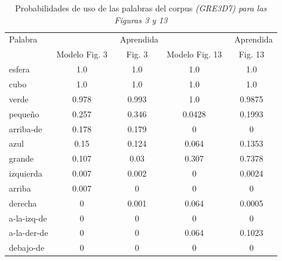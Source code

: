 \begin{table}[h!]
\begin{center}
\begin{tabular}{|l|c|c|c|c|}
\hline
Palabra &  \puse 					& \puse\ Aprendida & \puse\    							& \puse\  Aprendida \\
        & Modelo Fig. 3   & Fig. 3   				& Modelo Fig. 13  			&  Fig. 13  \\
\hline
esfera & 1.0 & 1.0 & 1.0 & 1.0 \\
cubo & 1.0 & 1.0 & 1.0 & 1.0 \\
verde & 0.978 & 0.993 & 1.0 & 0.9875 \\
peque\~no & 0.257 & 0.346 & 0.0428 & 0.1993 \\
arriba-de & 0.178 & 0.179 & 0 & 0\\ 
azul & 0.15 & 0.124 & 0.064 & 0.1353 \\
grande & 0.107 & 0.03 & 0.307 & 0.7378 \\
izquierda & 0.007 & 0.002 & 0 & 0.0024 \\
arriba & 0.007 & 0 & 0 & 0 \\
derecha & 0 & 0.001 & 0.064 & 0.0005 \\
a-la-izq-de & 0 & 0 & 0 & 0 \\
a-la-der-de & 0 & 0 & 0.064 & 0.1023 \\
debajo-de & 0 & 0 & 0 & 0 \\
\hline
\end{tabular}
\caption{Probabilidades de uso de las palabras del corpus \textit{(GRE3D7) para las Figuras 3 y 13 } 
\label{probability-of-use}}
\end{center}
\end{table}



